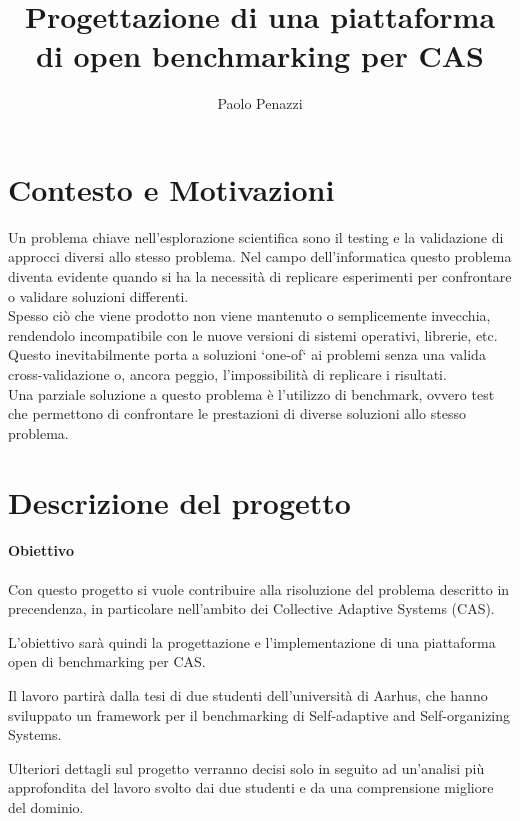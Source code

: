 \documentclass[12pt, a4paper]{article}
\title{Progettazione di una piattaforma di open benchmarking per CAS}
\author{Paolo Penazzi}
\begin{document}
\maketitle
%

\section{Contesto e Motivazioni} \label{sec:context}

Un problema chiave nell'esplorazione scientifica sono il testing e la validazione di approcci diversi allo stesso 
problema.
Nel campo dell'informatica questo problema diventa evidente quando si ha la necessità di replicare esperimenti
per confrontare o validare soluzioni differenti. \\

Spesso ciò che viene prodotto non viene mantenuto o semplicemente invecchia, rendendolo incompatibile con le nuove 
versioni di sistemi operativi, librerie, etc.
Questo inevitabilmente porta a soluzioni `one-of` ai problemi senza una valida cross-validazione o, ancora peggio,
l'impossibilità di replicare i risultati. \\

Una parziale soluzione a questo problema è l'utilizzo di benchmark, ovvero test che permettono di confrontare le prestazioni di
diverse soluzioni allo stesso problema.

\section{Descrizione del progetto}

\paragraph{Obiettivo}

Con questo progetto si vuole contribuire alla risoluzione del problema descritto in precendenza, in particolare 
nell'ambito dei Collective Adaptive Systems (CAS).

L'obiettivo sarà quindi la progettazione e l'implementazione di una piattaforma open di benchmarking per 
CAS.

Il lavoro partirà dalla tesi di due studenti dell'università di Aarhus, che hanno sviluppato un framework per il 
benchmarking di Self-adaptive and Self-organizing Systems.

Ulteriori dettagli sul progetto verranno decisi solo in seguito ad un'analisi più approfondita del lavoro svolto dai 
due studenti e da una comprensione migliore del dominio.
\end{document}
